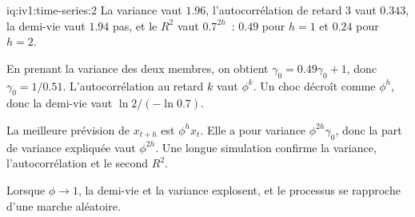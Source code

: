 \begin{solution}{iq:iv1:time-series:2}
La variance vaut $1.96$, l'autocorrélation de retard 3 vaut $0.343$, la demi-vie vaut $1.94$ pas, et le $R^2$ vaut $0.7^{2h}$~: $0.49$ pour $h = 1$ et $0.24$ pour $h = 2$.

En prenant la variance des deux membres, on obtient $\gamma_0 = 0.49\gamma_0 + 1$, donc $\gamma_0 = 1/0.51$. L'autocorrélation au retard $k$ vaut $\phi^k$. Un choc décroît comme $\phi^h$, donc la demi-vie vaut $\ln 2/(-\ln 0.7)$.

La meilleure prévision de $x_{t + h}$ est $\phi^hx_t$. Elle a pour variance $\phi^{2h}\gamma_0$, donc la part de variance expliquée vaut $\phi^{2h}$. Une longue simulation confirme la variance, l'autocorrélation et le second $R^2$.

Lorsque $\phi \to 1$, la demi-vie et la variance explosent, et le processus se rapproche d'une marche aléatoire.



\end{solution}

